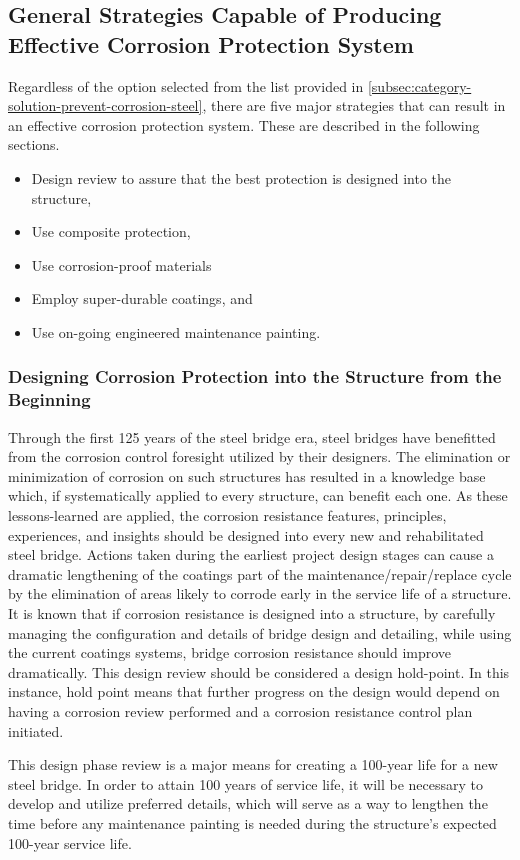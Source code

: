 \subsection{General Strategies Capable of Producing Effective Corrosion Protection System}
Regardless of the option selected from the list provided in \cref{subsec:category-solution-prevent-corrosion-steel}, there are five major strategies that can result in an effective corrosion protection system. These are described in the following sections.
\begin{itemize}
  \item Design review to assure that the best protection is designed into the structure,
  \item Use composite protection,
  \item Use corrosion-proof materials
  \item Employ super-durable coatings, and
  \item Use on-going engineered maintenance painting.
\end{itemize}
\subsubsection{Designing Corrosion Protection into the Structure from the Beginning}
Through the first 125 years of the steel bridge era, steel bridges have benefitted from the corrosion control
foresight utilized by their designers. The elimination or minimization of corrosion on such structures has resulted in a
knowledge base which, if systematically applied to every structure, can benefit each one. As these lessons-learned are
applied, the corrosion resistance features, principles, experiences, and insights should be designed into every new and
rehabilitated steel bridge. Actions taken during the earliest project design stages can cause a dramatic lengthening of
the coatings part of the maintenance/repair/replace cycle by the elimination of areas likely to corrode early in the
service life of a structure. It is known that if corrosion resistance is designed into a structure, by carefully managing
the configuration and details of bridge design and detailing, while using the current coatings systems, bridge
corrosion resistance should improve dramatically. This design review should be considered a design hold-point. In this instance, hold point means that further progress on the design would depend on having a corrosion review
performed and a corrosion resistance control plan initiated.

This design phase review is a major means for creating a 100-year life for a new steel bridge. In order to attain
100 years of service life, it will be necessary to develop and utilize preferred details, which will serve as a way to
lengthen the time before any maintenance painting is needed during the structure’s expected 100-year service life.

